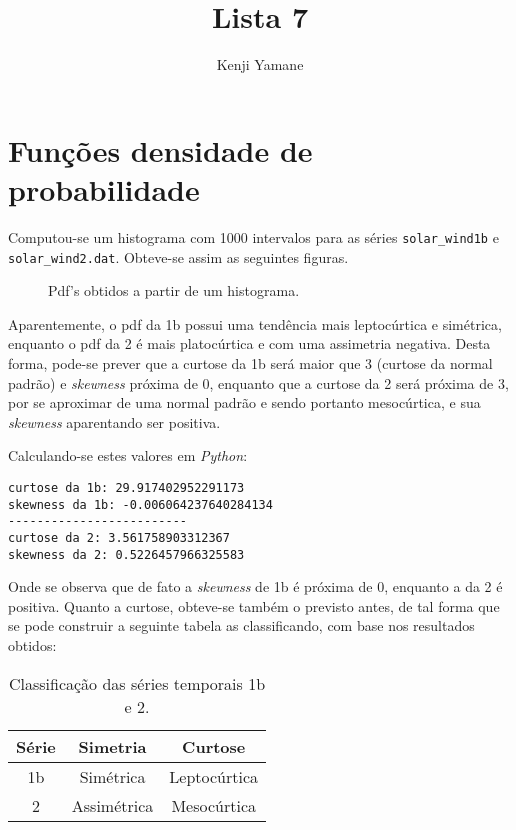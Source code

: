 \documentclass{article}[twocolumn]
\title{Lista 7}
\author{Kenji Yamane}
\begin{document}
	\maketitle
	\section{Fun\c{c}\~oes densidade de probabilidade}
	Computou-se um histograma com 1000 intervalos para as s\'eries \texttt{solar\_wind1b}
	e \texttt{solar\_wind2.dat}. Obteve-se assim as seguintes figuras.
	\begin{figure}[H]
		\centering
		\caption{Pdf's obtidos a partir de um histograma.}
	\end{figure}
	Aparentemente, o pdf da 1b possui uma tend\^encia mais leptoc\'urtica e sim\'etrica, enquanto
	o pdf da 2 \'e mais platoc\'urtica e com uma assimetria negativa. Desta forma, pode-se
	prever que a curtose da 1b ser\'a maior que 3 (curtose da normal padr\~ao) e \textit{skewness}
	pr\'oxima de 0, enquanto que a curtose da 2 ser\'a pr\'oxima de 3, por se aproximar de uma
	normal padr\~ao e sendo portanto mesoc\'urtica, e sua \textit{skewness} aparentando ser positiva.

	Calculando-se estes valores em \textit{Python}:
	\begin{verbatim}
curtose da 1b: 29.917402952291173
skewness da 1b: -0.006064237640284134
-------------------------
curtose da 2: 3.561758903312367
skewness da 2: 0.5226457966325583
	\end{verbatim}
	Onde se observa que de fato a \textit{skewness} de 1b \'e pr\'oxima de 0, enquanto a
	da 2 \'e positiva. Quanto a curtose, obteve-se tamb\'em o previsto antes, de tal forma
	que se pode construir a seguinte tabela as classificando, com base nos resultados obtidos:
	\begin{table}[H]
		\centering
		\begin{tabular}{ccc}
			\hline
			S\'erie & Simetria & Curtose\\
			\hline
			1b & Sim\'etrica & Leptoc\'urtica\\
			2 & Assim\'etrica & Mesoc\'urtica\\
			\hline
		\end{tabular}
		\caption{Classifica\c{c}\~ao das s\'eries temporais 1b e 2.}
	\end{table}
\end{document}
